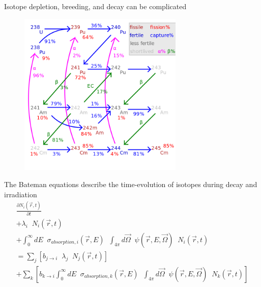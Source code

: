 \documentclass{beamer}
\begin{document}
        \begin{frame}{Isotope depletion, breeding, and decay can be complicated}
            \begin{figure}
                \centering
                \includegraphics[width=0.7\textwidth]{./img/fuelCycle.png}
                \caption*{}
            \end{figure}
        \end{frame}

        \begin{frame}{The Bateman equations describe the time-evolution of isotopes during decay and irradiation}
            \begin{equation*}
                \begin{split}
                    \frac{\partial N_i(\vec r, t)}{\partial t} \\
                    + \lambda_i \; \; N_i(\vec r, t) \\
                    + \int_0^\infty \! \! \! \! dE \; \; \sigma_{absorption,i} ( \vec r, E) \; \; \int_{4\pi} \! \! \! \! d\vec\Omega \; \; \psi(\vec r, E, \vec \Omega) \; \; N_i(\vec r, t) \\
                    = \sum_j \left[ b_{j \rightarrow i} \; \; \lambda_j \; \; N_j(\vec r, t) \right] \\
                    + \sum_k \left[ b_{k \rightarrow i} \int_0^\infty \! \! \! \! dE \; \; \sigma_{absorption,k} ( \vec r, E) \; \; \int_{4\pi} \! \! \! \! d\vec\Omega \; \; \psi(\vec r, E, \vec \Omega) \; \; N_k(\vec r, t) \right] \\
                \end{split}
            \end{equation*}
        \end{frame}
\end{document}
